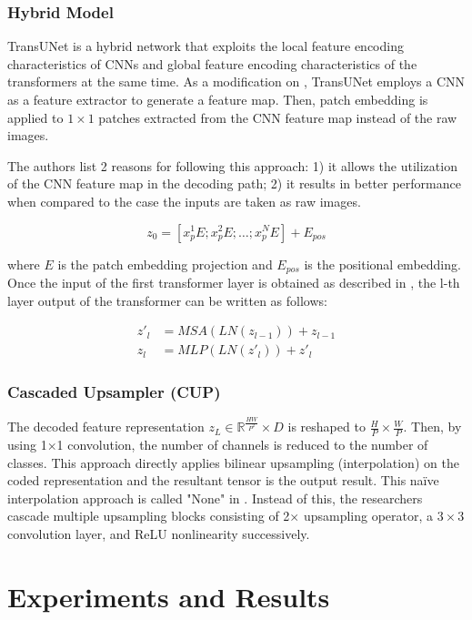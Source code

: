 \documentclass{IEEEtran}
\begin{document}
\subsubsection{Hybrid Model}
TransUNet is a hybrid network that exploits the local feature encoding characteristics of CNNs and global feature encoding characteristics of the transformers at the same time. As a modification on \cite{dosovitskiy2020image}, TransUNet employs a CNN as a feature extractor to generate a feature map. Then, patch embedding is applied to $1 \times 1$ patches extracted from the CNN feature map instead of the raw images. 

The authors list 2 reasons for following this approach: 1) it allows the utilization of the CNN feature map in the decoding path; 2) it results in better performance when compared to the case the inputs are taken as raw images. 

\begin{equation}
    z_0 = [x_p^1E; x_p^2E; \hdots; x_p^NE] + E_{pos}
    \label{eq:firstinput}
\end{equation}

where $E$ is the patch embedding projection and $E_{pos}$ is the positional embedding. 
Once the input of the first transformer layer is obtained as described in , the l-th layer output of the transformer can be written as follows: 

\begin{eqnarray}
    {z'}_l &= MSA(LN(z_{l-1})) + z_{l-1} \\
    z_l &= MLP(LN({z'}_l)) + {z'}_l
\end{eqnarray}
\vfill\null\newpage
\subsubsection{Cascaded Upsampler (CUP)}
The decoded feature representation $z_L \in \mathbb{R}^{\frac{HW}{P^2}} \times D$ is reshaped to $\frac{H}{P} \times \frac{W}{P}$. Then, by using 1$\times$1 convolution, the number of channels is reduced to the number of classes. This approach directly applies bilinear upsampling (interpolation) on the coded representation and the resultant tensor is the output result. This na\"ive interpolation approach is called "None" in \cite{chen2021transunet}. Instead of this, the researchers cascade multiple upsampling blocks consisting of 2$\times$ upsampling operator, a $3\times 3$ convolution layer, and ReLU nonlinearity successively. 

\section{Experiments and Results}
\end{document}
